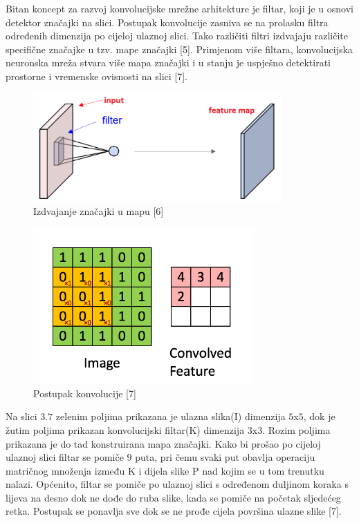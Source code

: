 \documentclass[times, utf8, zavrsni]{fer}
\begin{document}
Bitan koncept za razvoj konvolucijske mrežne arhitekture je filtar, koji je u osnovi detektor značajki na slici. Postupak konvolucije zasniva se na prolasku filtra određenih dimenzija po cijeloj ulaznoj slici. Tako različiti filtri izdvajaju različite specifične značajke u tzv. mape značajki  [5]. Primjenom više filtara, konvolucijska neuronska mreža stvara više mapa značajki i u stanju je uspješno detektirati prostorne i vremenske ovisnosti na slici [7].
%
\begin{figure}[!h]
\centering
\includegraphics[width=0.85\textwidth]{./slike/conv5}
\caption{Izdvajanje značajki u mapu [6]}
\label{fig:conv4}
\end{figure}
%
\newpage
%
\begin{figure}[!h]
\centering
\includegraphics[width=0.75\textwidth]{./slike/conv4}
\caption{Postupak konvolucije [7]}
\label{fig:conv3}
\end{figure}
%
Na slici $3.7$ zelenim poljima prikazana je ulazna slika(I) dimenzija $5$x$5$, dok je žutim poljima prikazan konvolucijski filtar(K) dimenzija $3$x$3$. Rozim poljima prikazana je do tad konstruirana mapa značajki. Kako bi prošao po cijeloj ulaznoj slici filtar se pomiče $9$ puta, pri čemu svaki put obavlja operaciju matričnog množenja između K i dijela slike P nad kojim se u tom trenutku nalazi. Općenito, filtar se pomiče po ulaznoj slici s određenom duljinom koraka  s lijeva na desno dok ne dođe do ruba slike, kada se pomiče na početak sljedećeg retka. Postupak se ponavlja sve dok se ne prođe cijela površina ulazne slike [7].\\
\end{document}
